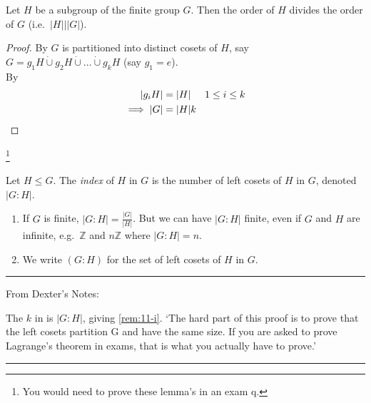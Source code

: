 \begin{theorem}
\protect\hypertarget{thm:three}{}\label{thm:three}
Let \(H\) be a subgroup of the finite group \(G\).
Then the order of \(H\) divides the order of \(G\) (i.e.~\(|H| \bigg| |G|\)).
\end{theorem}

\begin{proof}
By  \(G\) is partitioned into distinct cosets of \(H\), say \(G = g_1 H \mathbin{\dot{\cup}} g_2 H \mathbin{\dot{\cup}} \ldots \mathbin{\dot{\cup}} g_k H\) (say \(g_1 = e\)).\\
By 
\begin{align*}
    |g_i H| &= |H| \hspace{.5cm} 1 \leq i \leq k \\
    \implies |G| &= |H|k
\end{align*}
\end{proof}
\footnote{You would need to prove these lemma's in an exam q.}

\begin{definition}
\protect\hypertarget{def:fourteen}{}\label{def:fourteen}
Let \(H \leq G\).
The \emph{index} of \(H\) in \(G\) is the number of left cosets of \(H\) in \(G\), denoted \(|G : H|\).
\end{definition}

\begin{remark} \mbox{}
    \begin{enumerate}
    \def\labelenumi{\roman{enumi}.}
    \item
    If \(G\) is finite, \(|G : H| = \frac{|G|}{|H|}\).
    But we can have \(|G : H|\) finite, even if \(G\) and \(H\) are infinite, e.g.~\(\mathbb{Z}\) and \(n\mathbb{Z}\) where \(|G : H| = n\). \label{rem:11-i}
    \item
    We write \((G : H)\) for the set of left cosets of \(H\) in \(G\).
    \end{enumerate}
\end{remark}

\begin{center}\rule{\linewidth}{0.5pt}\end{center}
From Dexter's Notes:

The $k$ in  is $| G : H |$, giving \cref{rem:11-i}.
`The hard part of this proof is to prove that the left cosets partition G
and have the same size. 
If you are asked to prove Lagrange’s theorem in exams,
that is what you actually have to prove.'
\begin{center}\rule{\linewidth}{0.5pt}\end{center}

